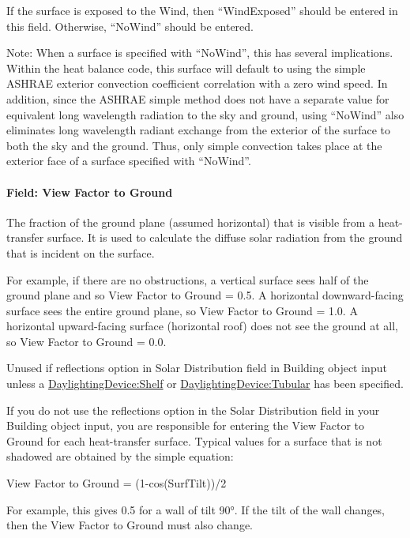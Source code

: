 If the surface is exposed to the Wind, then ``WindExposed'' should be entered in this field. Otherwise, ``NoWind'' should be entered.

\begin{callout}
Note: When a surface is specified with ``NoWind'', this has several implications. Within the heat balance code, this surface will default to using the simple ASHRAE exterior convection coefficient correlation with a zero wind speed. In addition, since the ASHRAE simple method does not have a separate value for equivalent long wavelength radiation to the sky and ground, using ``NoWind'' also eliminates long wavelength radiant exchange from the exterior of the surface to both the sky and the ground. Thus, only simple convection takes place at the exterior face of a surface specified with ``NoWind''.
\end{callout}

\paragraph{Field: View Factor to Ground}\label{field-view-factor-to-ground-1}

The fraction of the ground plane (assumed horizontal) that is visible from a heat-transfer surface. It is used to calculate the diffuse solar radiation from the ground that is incident on the surface.

For example, if there are no obstructions, a vertical surface sees half of the ground plane and so View Factor to Ground = 0.5. A horizontal downward-facing surface sees the entire ground plane, so View Factor to Ground = 1.0. A horizontal upward-facing surface (horizontal roof) does not see the ground at all, so View Factor to Ground = 0.0.

Unused if reflections option in Solar Distribution field in Building object input unless a \hyperref[daylightingdeviceshelf]{DaylightingDevice:Shelf} or \hyperref[daylightingdevicetubular]{DaylightingDevice:Tubular} has been specified.

If you do not use the reflections option in the Solar Distribution field in your Building object input, you are responsible for entering the View Factor to Ground for each heat-transfer surface. Typical values for a surface that is not shadowed are obtained by the simple equation:

View Factor to Ground = (1-cos(SurfTilt))/2

For example, this gives 0.5 for a wall of tilt 90°. If the tilt of the wall changes, then the View Factor to Ground must also change.

